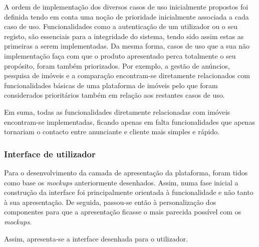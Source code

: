 A ordem de implementação dos diversos casos de uso inicialmente propostos foi definida tendo em conta uma noção de prioridade inicialmente associada a cada caso de uso. Funcionalidades como a autenticação de um utilizador ou o seu registo, são essenciais para a integridade do sistema, tendo sido assim estas as primeiras a serem implementadas. Da mesma forma, casos de uso que a sua não implementação faça com que o produto apresentado perca totalmente o seu propósito, foram também priorizados. Por exemplo, a gestão de anúncios, pesquisa de imóveis e a comparação encontram-se diretamente relacionados com funcionalidades básicas de uma plataforma de imóveis pelo que foram considerados prioritários também em relação aos restantes casos de uso.

Em suma, todas as funcionalidades diretamente relacionadas com imóveis encontram-se implementadas, ficando apenas em falta funcionalidades que apenas tornariam o contacto entre anunciante e cliente mais simples e rápido.


\subsubsection{Interface de utilizador}

Para o desenvolvimento da camada de apresentação da plataforma, foram tidos como base os \textit{mockups} anteriormente desenhados. Assim, numa fase inicial a construção da interface foi principalmente orientada à funcionalidade e não tanto à sua apresentação. De seguida, passou-se então à personalização dos componentes para que a apresentação ficasse o mais parecida possível com os \textit{mockups}.

Assim, apresenta-se a interface desenhada para o utilizador.

